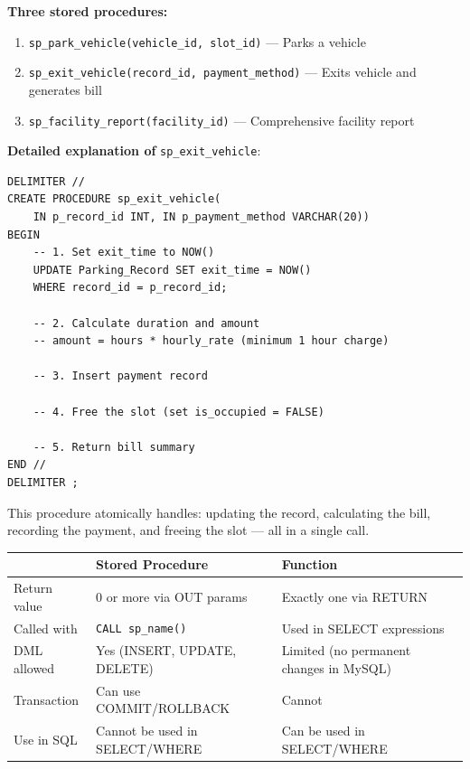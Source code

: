 \documentclass[12pt,a4paper]{article}
\begin{document}
\begin{questionbox}
\end{questionbox}
\begin{answerbox}
\textbf{Three stored procedures:}
\begin{enumerate}[nosep]
    \item \texttt{sp\_park\_vehicle(vehicle\_id, slot\_id)} --- Parks a vehicle
    \item \texttt{sp\_exit\_vehicle(record\_id, payment\_method)} --- Exits vehicle and generates bill
    \item \texttt{sp\_facility\_report(facility\_id)} --- Comprehensive facility report
\end{enumerate}

\textbf{Detailed explanation of} \texttt{sp\_exit\_vehicle}:
\begin{lstlisting}
DELIMITER //
CREATE PROCEDURE sp_exit_vehicle(
    IN p_record_id INT, IN p_payment_method VARCHAR(20))
BEGIN
    -- 1. Set exit_time to NOW()
    UPDATE Parking_Record SET exit_time = NOW()
    WHERE record_id = p_record_id;

    -- 2. Calculate duration and amount
    -- amount = hours * hourly_rate (minimum 1 hour charge)

    -- 3. Insert payment record

    -- 4. Free the slot (set is_occupied = FALSE)

    -- 5. Return bill summary
END //
DELIMITER ;
\end{lstlisting}

This procedure atomically handles: updating the record, calculating the bill, recording the payment, and freeing the slot --- all in a single call.
\end{answerbox}

\begin{questionbox}
\end{questionbox}
\begin{answerbox}
\begin{longtable}{@{}lp{5.5cm}p{5.5cm}@{}}
\toprule
& \textbf{Stored Procedure} & \textbf{Function} \\
\midrule
Return value & 0 or more via OUT params & Exactly one via RETURN \\
Called with & \texttt{CALL sp\_name()} & Used in SELECT expressions \\
DML allowed & Yes (INSERT, UPDATE, DELETE) & Limited (no permanent changes in MySQL) \\
Transaction & Can use COMMIT/ROLLBACK & Cannot \\
Use in SQL & Cannot be used in SELECT/WHERE & Can be used in SELECT/WHERE \\
\bottomrule
\end{longtable}
\end{answerbox}
\end{document}
